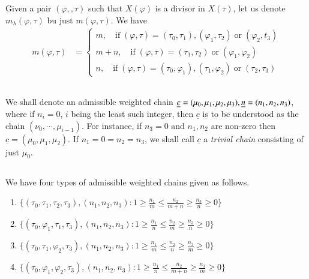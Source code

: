 Given a pair $(\varphi,,\tau)$ such that $X(\varphi)$ is a divisor in $X(\tau)$, let us denote $m_{\lambda}(\varphi, \tau)$ bu just $m(\varphi, \tau)$. We have
\begin{align*}
m(\varphi, \tau) &=
\begin{cases}
m, \quad \text{if}\; (\varphi, \tau) =(\tau_{0}, \tau_{1}), (\varphi_{1}, \tau_{2}) \;\text{or}\; (\varphi_{2}, t_{3})\\
m+n,\quad \text{if}\; (\varphi, \tau) =(\tau_{1}, \tau_{2})\; \text{or} \; (\varphi_{1}, \varphi_{2})\\
n, \quad \text{if} \; (\varphi, \tau) =(\tau_{0}, \varphi_{1}), (\tau_{1}, \varphi_{2})\; \text{or}\; (\tau_{2}, \tau_{3})
\end{cases}
\end{align*}

\subsection{}\label{art9-subsec-4.4}
We shall denote an admissible weighted chain $\underline{c} =(\mu_{0},\mu_{1}, \mu_{2}, \mu_{3}),\break \underline{n} = (n_{1}, n_{2}, n_{3})$, where if $n_{i} = 0$, $i$ being the least such integer, then $\underline{c}$ is to be understood as the chain $(\nu_{0}, \cdots,\mu_{i-1})$. For instance, if $n_{3}=0$ and $n_{1}, n_{2}$ are non-zero then $\underline{c} = (\mu_{0}, \mu_{1},\mu_{2})$. If $n_{1}=0 =n_{2} =n_{3}$, we shall call $\underline{c}$ a \textit{trivial chain} consisting of just $\mu_{0}$.  

\subsection{}\label{art9-subsec-4.5}
We have four types of admissible weighted chains given as follows.
\begin{enumerate}[Type I:]
\item $\{(\tau_{0}, \tau_{1}, \tau_{2}, \tau_{3}), (n_{1}, n_{2}, n_{3}) : 1 \geq \frac{n_{1}}{m} \leq \frac{n_{2}}{m+n}   \geq \frac{n_{3}}{n}\geq 0\}$\label{art9-subsec4.5-I}

\item $\{(\tau_{0}, \varphi_{1}, \tau_{1}, \tau_{3}), (n_{1}, n_{2}, n_{3}) : 1 \geq \frac{n_{1}}{n} \leq \frac{n_{2}}{m} \geq \frac{n_{3}}{n} \geq 0\}$\label{art9-subsec4.5-II}

\item $\{(\tau_{0}, \tau_{1}, \varphi_{2}, \tau_{3}), (n_{1}, n_{2}, n_{3}) : 1 \geq \frac{n_{1}}{m} \leq \frac{n_{2}}{n} \geq \frac{n_{3}}{m} \geq 0\}$\label{art9-subsec4.5-III}

\item $\{(\tau_{0}, \varphi_{1}, \varphi_{2}, \tau_{3}), (n_{1}, n_{2}, n_{3}) : 1 \geq \frac{n_{1}}{n} \leq \frac{n_{2}}{m+n} \geq \frac{n_{3}}{m} \geq 0\}$\label{art9-subsec4.5-IV}
\end{enumerate}

